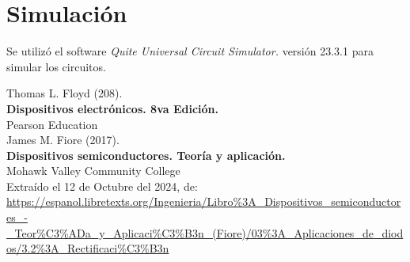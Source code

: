 \documentclass[letter,twoside,11pt]{article}
\begin{document}
\section{Simulación}
Se utilizó el software \emph{Quite Universal Circuit Simulator.} versión 23.3.1
para simular los circuitos.





\begin{thebibliography}{99}

Thomas L. Floyd (208).\\
\textbf{Dispositivos electrónicos. 8va Edición.}\\
Pearson Education\\

James M. Fiore (2017).\\
\textbf{Dispositivos semiconductores. Teoría y aplicación.}\\
Mohawk Valley Community College\\
Extraído el 12 de Octubre del 2024, de: \\
\url{https://espanol.libretexts.org/Ingenieria/Libro%3A_Dispositivos_semiconductores_-_Teor%C3%ADa_y_Aplicaci%C3%B3n_(Fiore)/03%3A_Aplicaciones_de_diodos/3.2%3A_Rectificaci%C3%B3n}

\end{thebibliography}
\end{document}

